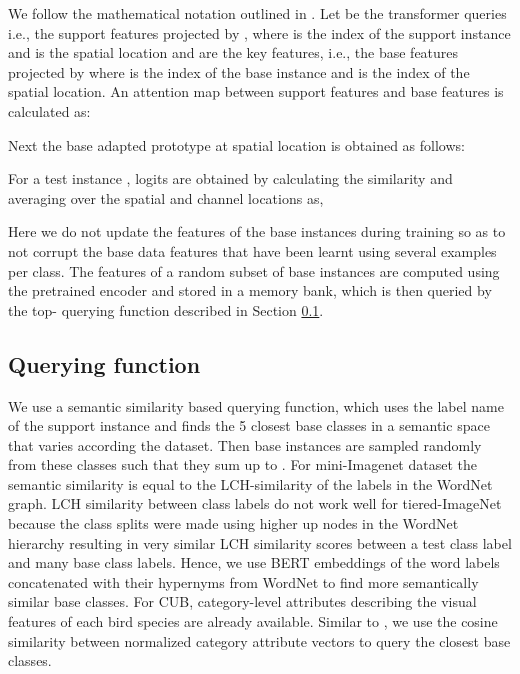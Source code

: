 \documentclass{bmvc2k}
\begin{document}
We follow the mathematical notation outlined in \cite{doersch2020crosstransformers}. Let  be the transformer queries i.e., the support features projected by , where  is the index of the support instance and  is the spatial location and  are the key features, i.e., the base features projected by  where  is the index of the base instance and  is the index of the spatial location. An attention map  between support features and base features is calculated as: 

Next the base adapted prototype  at spatial location  is obtained as follows:

For a test instance , logits are obtained by calculating the similarity and averaging over the spatial and channel locations as,

Here we do not update the features of the base instances during training so as to not corrupt the base data features that have been learnt using several examples per class. The features of a random subset of base instances are computed using the pretrained encoder  and stored in a memory bank, which is then queried by the top- querying function described in Section \ref{sec:queryingfunction}.


\subsection{Querying function} \label{sec:queryingfunction}
We use a semantic similarity based querying function, which uses the label name of the support instance and finds the 5 closest base classes in a semantic space that varies according the dataset. Then base instances are sampled randomly from these classes such that they sum up to . For mini-Imagenet dataset the semantic similarity is equal to the LCH-similarity\cite{leacock1998combining} of the labels in the WordNet graph\cite{miller1995wordnet}. LCH similarity between class labels do not work well for tiered-ImageNet because the class splits were made using higher up nodes in the WordNet hierarchy resulting in very similar LCH similarity scores between a test class label and many base class labels. Hence, we use BERT\cite{devlin-etal-2019-bert} embeddings of the word labels concatenated with their hypernyms from WordNet to find more semantically similar base classes. For CUB, category-level attributes describing the visual features of each bird species are already available. Similar to \cite{shi2019relational}, 
we use the cosine similarity between normalized category attribute vectors to query the closest base classes.
\end{document}
